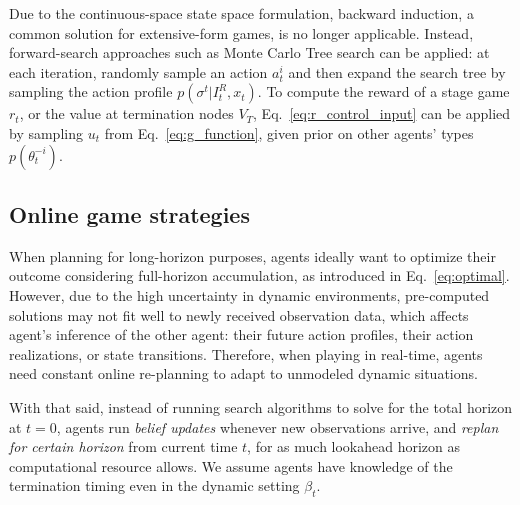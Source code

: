 \documentclass[letterpaper, 10 pt, conference]{ieeeconf}  %
\newcommand{\argmax}{\arg\!\!\max}
\begin{document}
Due to the continuous-space state space formulation, backward induction, a common 
solution for extensive-form games, is no longer applicable. Instead, 
forward-search approaches such as Monte Carlo Tree search can be applied: at 
each iteration, randomly sample an action $a^i_t$ and then expand the search 
tree by sampling the action profile 
$p(\sigma^t|I^R_t,x_t)$. To 
compute the reward of a stage game $r_t$, or the value at termination nodes $V_T$, Eq.~\ref{eq:r_control_input} can be applied by sampling $u_t$ from 
Eq.~\ref{eq:g_function}, given prior on other agents' types $p(\theta^{-i}_t)$. 
\vspace{-.2em}
\subsection{Online game strategies}
\vspace{-.2em}
When planning for long-horizon purposes, agents ideally 
want to optimize their outcome considering full-horizon accumulation, as introduced in 
Eq.~\ref{eq:optimal}. However, due to the high uncertainty in dynamic 
environments, pre-computed solutions may not fit well to newly received 
observation data, which affects agent's inference of the other 
agent: their future action profiles, their action realizations, or state transitions. Therefore, when 
playing in real-time, agents need constant online re-planning to adapt 
to unmodeled dynamic situations. 

With that said, instead of running search algorithms to solve for the total 
horizon at $t=0$, agents run \textit{belief updates} whenever new 
observations arrive, and 
\textit{replan for certain horizon} from current time $t$, for as much 
lookahead horizon as computational resource allows. 
We assume agents have knowledge of the termination timing even in the dynamic setting $\beta_t$. 
\end{document}
